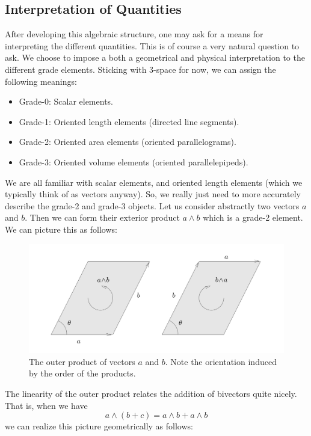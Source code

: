 \subsection{Interpretation of Quantities}
After developing this algebraic structure, one may ask for a means for interpreting the different quantities.  This is of course a very natural question to ask.  We choose to impose a both a geometrical and physical interpretation to the different grade elements. Sticking with 3-space for now, we can assign the following meanings:
\begin{itemize}
    \item Grade-0: Scalar elements.
    \item Grade-1: Oriented length elements (directed line segments).
    \item Grade-2: Oriented area elements (oriented parallelograms).
    \item Grade-3: Oriented volume elements (oriented parallelepipeds).  
\end{itemize}
We are all familiar with scalar elements, and oriented length elements (which we typically think of as vectors anyway).  So, we really just need to more accurately describe the grade-2 and grade-3 objects.  Let us consider abstractly two vectors $a$ and $b$. Then we can form their exterior product $a\wedge b$ which is a grade-2 element.  We can picture this as follows:
\begin{figure}[H]
    \centering
    \includegraphics[width=\textwidth]{figures/ab_outer_prod.png}
    \caption{The outer product of vectors $a$ and $b$. Note the orientation induced by the order of the products.}
    \label{fig:bivector}
\end{figure}
The linearity of the outer product relates the addition of bivectors quite nicely.  That is, when we have
\[
a \wedge (b+c) = a\wedge b + a \wedge b
\]
we can realize this picture geometrically as follows:
